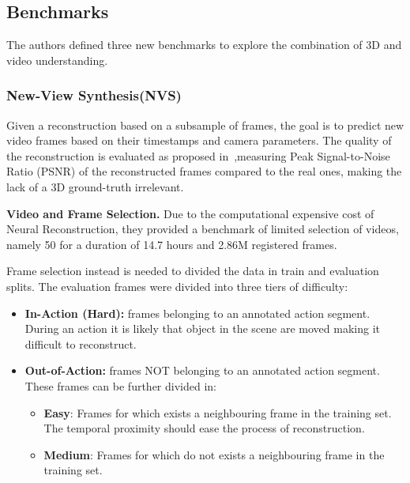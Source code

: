 \subsection{Benchmarks}
The authors defined three new benchmarks  to explore the combination of 3D and video understanding.

\subsubsection{New-View Synthesis(NVS)}
Given a reconstruction based on a subsample of frames, the goal is to predict new video frames based on their timestamps and camera parameters.
The quality of the reconstruction is evaluated as proposed in~\cite{nerf},measuring Peak Signal-to-Noise Ratio (PSNR) of the reconstructed frames
compared to the real ones, making the lack of a 3D ground-truth irrelevant.

\textbf{Video and Frame Selection.} Due to the computational expensive cost of Neural Reconstruction, they provided a benchmark of limited selection of 
videos, namely 50 for a duration of 14.7 hours and 2.86M registered frames.

Frame selection instead is needed to divided the data in train and evaluation splits. The evaluation frames were divided into three tiers of difficulty:
\begin{itemize}
    \item \textbf{In-Action (Hard):} frames belonging to an annotated action segment. During an action it is likely that object in the scene are moved making it difficult
        to reconstruct.
    \item  \textbf{Out-of-Action:} frames NOT belonging to an annotated action segment. These frames can be further divided in:
                \begin{itemize}
                    \item \textbf{Easy}: Frames for which exists a neighbouring frame in the training set. The temporal proximity should ease the process of reconstruction.
                    \item \textbf{Medium}: Frames for which do not exists a neighbouring frame in the training set. 
                \end{itemize}
\end{itemize}

